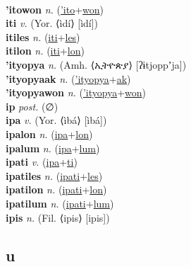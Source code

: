  \label{'itoak} \\
\textbf{'itowon} \textit{n.} (\hyperref['ito]{'ito}+\hyperref[won]{won})
 \label{'itowon} \\
\textbf{iti} \textit{v.} (Yor. ⟨ìdí⟩ [ìdí])
 \label{iti} \\
\textbf{itiles} \textit{n.} (\hyperref[iti]{iti}+\hyperref[les]{les})
 \label{itiles} \\
\textbf{itilon} \textit{n.} (\hyperref[iti]{iti}+\hyperref[lon]{lon})
 \label{itilon} \\
\textbf{'ityopya} \textit{n.} (Amh. ⟨ኢትዮጵያ⟩ [ʔɨtjoppʼja])
 \label{'ityopya} \\
\textbf{'ityopyaak} \textit{n.} (\hyperref['ityopya]{'ityopya}+\hyperref[ak]{ak})
 \label{'ityopyaak} \\
\textbf{'ityopyawon} \textit{n.} (\hyperref['ityopya]{'ityopya}+\hyperref[won]{won})
 \label{'ityopyawon} \\
\textbf{ip} \textit{post.} (∅)
 \label{ip} \\
\textbf{ipa} \textit{v.} (Yor. ⟨ìbá⟩ [ìbá])
 \label{ipa} \\
\textbf{ipalon} \textit{n.} (\hyperref[ipa]{ipa}+\hyperref[lon]{lon})
 \label{ipalon} \\
\textbf{ipalum} \textit{n.} (\hyperref[ipa]{ipa}+\hyperref[lum]{lum})
 \label{ipalum} \\
\textbf{ipati} \textit{v.} (\hyperref[ipa]{ipa}+\hyperref[ti]{ti})
 \label{ipati} \\
\textbf{ipatiles} \textit{n.} (\hyperref[ipati]{ipati}+\hyperref[les]{les})
 \label{ipatiles} \\
\textbf{ipatilon} \textit{n.} (\hyperref[ipati]{ipati}+\hyperref[lon]{lon})
 \label{ipatilon} \\
\textbf{ipatilum} \textit{n.} (\hyperref[ipati]{ipati}+\hyperref[lum]{lum})
 \label{ipatilum} \\
\textbf{ipis} \textit{n.} (Fil. ⟨ipis⟩ [ipis])
 \label{ipis} \\
\subsection{u}


